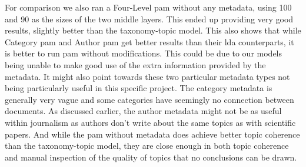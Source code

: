 For comparison we also ran a Four-Level \gls{pam} without any metadata, using 100 and 90 as the sizes of the two middle layers.
This ended up providing very good results, slightly better than the taxonomy-topic model.
This also shows that while Category \gls{pam} and Author \gls{pam} get better results than their \gls{lda} counterparts, it is better to run \gls{pam} without modifications.
This could be due to our models being unable to make good use of the extra information provided by the metadata.
It might also point towards these two particular metadata types not being particularly useful in this specific project.
The category metadata is generally very vague and some categories have seemingly no connection between documents.
As discussed earlier, the author metadata might not be as useful within journalism as authors don't write about the same topics as with scientific papers.
And while the \gls{pam} without metadata does achieve better topic coherence than the taxonomy-topic model, they are close enough in both topic coherence and manual inspection of the quality of topics that no conclusions can be drawn.
